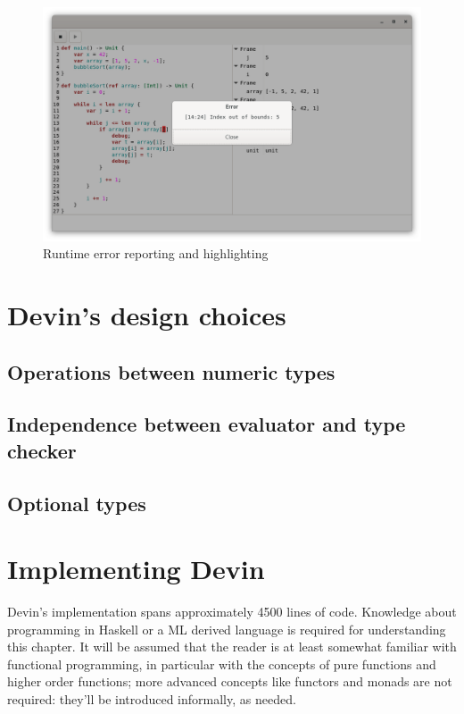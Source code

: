 \documentclass[11pt, american, draft]{PhdThesis}
\begin{document}
  \begin{figure}[H]
    \center
    \includegraphics[width=0.9\linewidth]{6.png}
    \caption{Runtime error reporting and highlighting}
  \end{figure}

  \chapter{Devin's design choices}

  \section{Operations between numeric types}

  \section{Independence between evaluator and type checker}

  \section{Optional types}

  \chapter{Implementing Devin}

  Devin's implementation spans approximately 4500 lines of code. Knowledge about programming in
  Haskell or a ML derived language is required for understanding this chapter. It will be assumed
  that the reader is at least somewhat familiar with functional programming, in particular with the
  concepts of pure functions and higher order functions; more advanced concepts like functors and
  monads are not required: they'll be introduced informally, as needed.
\end{document}
